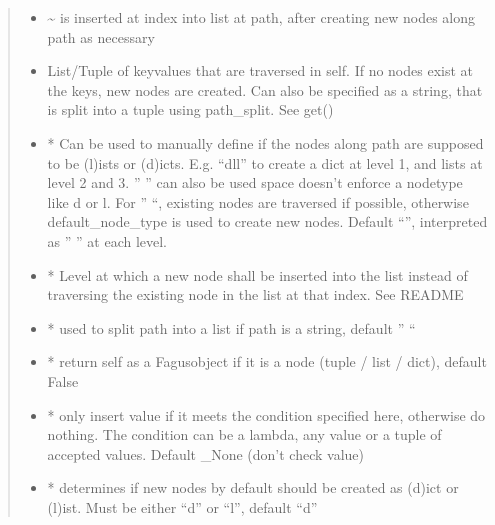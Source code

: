 \documentclass[a4paper,10pt,english]{sphinxmanual}
\begin{document}
\begin{fulllineitems}
\begin{fulllineitems}
\begin{quote}
\begin{description}
\begin{itemize}
\item {}
\sphinxAtStartPar
{} \textendash{} \textasciitilde{} is inserted at index into list at path, after creating new nodes along path as necessary

\item {}
\sphinxAtStartPar
{} \textendash{} List/Tuple of key\sphinxhyphen{}values that are traversed in self. If no nodes exist at the keys, new nodes are
created. Can also be specified as a string, that is split into a tuple using path\_split. See get()

\item {}
\sphinxAtStartPar
{} \textendash{} * Can be used to manually define if the nodes along path are supposed to be (l)ists or
(d)icts. E.g. “dll” to create a dict at level 1, and lists at level 2 and 3. ” ” can also be used \sphinxhyphen{}
space doesn’t enforce a node\sphinxhyphen{}type like d or l. For ” “, existing nodes are traversed if possible,
otherwise default\_node\_type is used to create new nodes. Default “”, interpreted as ” ” at each level.

\item {}
\sphinxAtStartPar
{} \textendash{} * Level at which a new node shall be inserted into the list instead of traversing the
existing node in the list at that index. See README

\item {}
\sphinxAtStartPar
{} \textendash{} * used to split path into a list if path is a string, default ” “

\item {}
\sphinxAtStartPar
{} \textendash{} * return self as a Fagus\sphinxhyphen{}object if it is a node (tuple / list / dict), default False

\item {}
\sphinxAtStartPar
{} \textendash{} * only insert value if it meets the condition specified here, otherwise do nothing. The condition can
be a lambda, any value or a tuple of accepted values. Default \_None (don’t check value)

\item {}
\sphinxAtStartPar
{} \textendash{} * determines if new nodes by default should be created as (d)ict or (l)ist. Must be
either “d” or “l”, default “d”


\end{itemize}
\end{description}
\end{quote}
\end{fulllineitems}
\end{fulllineitems}
\end{document}
